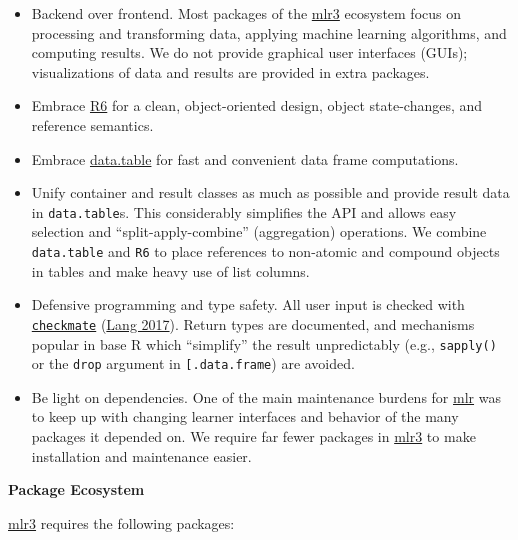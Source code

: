 \documentclass[
]{scrbook}
\providecommand{\tightlist}{%
  \setlength{\itemsep}{0pt}\setlength{\parskip}{0pt}}
\begin{document}
\begin{itemize}
\tightlist
\item
  Backend over frontend.
  Most packages of the \href{https://mlr3.mlr-org.com}{mlr3} ecosystem focus on processing and transforming data, applying machine learning algorithms, and computing results.
  We do not provide graphical user interfaces (GUIs); visualizations of data and results are provided in extra packages.
\item
  Embrace \href{https://cran.r-project.org/package=R6}{R6} for a clean, object-oriented design, object state-changes, and reference semantics.
\item
  Embrace \href{https://cran.r-project.org/package=data.table}{data.table} for fast and convenient data frame computations.
\item
  Unify container and result classes as much as possible and provide result data in \texttt{data.table}s.
  This considerably simplifies the API and allows easy selection and ``split-apply-combine'' (aggregation) operations.
  We combine \texttt{data.table} and \texttt{R6} to place references to non-atomic and compound objects in tables and make heavy use of list columns.
\item
  Defensive programming and type safety.
  All user input is checked with \href{https://cran.r-project.org/package=checkmate}{\texttt{checkmate}} (\protect\hyperlink{ref-checkmate}{Lang 2017}).
  Return types are documented, and mechanisms popular in base R which ``simplify'' the result unpredictably (e.g., \texttt{sapply()} or the \texttt{drop} argument in \texttt{{[}.data.frame}) are avoided.
\item
  Be light on dependencies.
  One of the main maintenance burdens for \href{https://mlr.mlr-org.com}{mlr} was to keep up with changing learner interfaces and behavior of the many packages it depended on.
  We require far fewer packages in \href{https://mlr3.mlr-org.com}{mlr3} to make installation and maintenance easier.
\end{itemize}

\textbf{Package Ecosystem}

\href{https://mlr3.mlr-org.com}{mlr3} requires the following packages:
\end{document}
